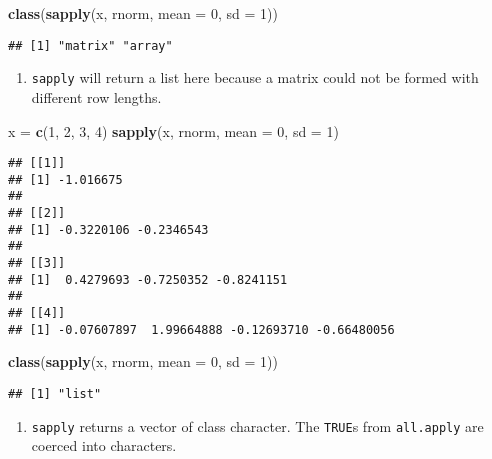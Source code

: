 \documentclass[
]{article}
\newenvironment{Shaded}{\begin{snugshade}}{\end{snugshade}}
\newcommand{\DataTypeTok}[1]{\textcolor[rgb]{0.13,0.29,0.53}{#1}}
\newcommand{\DecValTok}[1]{\textcolor[rgb]{0.00,0.00,0.81}{#1}}
\newcommand{\KeywordTok}[1]{\textcolor[rgb]{0.13,0.29,0.53}{\textbf{#1}}}
\newcommand{\NormalTok}[1]{#1}
\newcommand{\StringTok}[1]{\textcolor[rgb]{0.31,0.60,0.02}{#1}}
\providecommand{\tightlist}{%
  \setlength{\itemsep}{0pt}\setlength{\parskip}{0pt}}
\begin{document}
\begin{Shaded}
\begin{Highlighting}[]
\KeywordTok{class}\NormalTok{(}\KeywordTok{sapply}\NormalTok{(x, rnorm, }\DataTypeTok{mean =} \DecValTok{0}\NormalTok{, }\DataTypeTok{sd =} \DecValTok{1}\NormalTok{))}
\end{Highlighting}
\end{Shaded}

\begin{verbatim}
## [1] "matrix" "array"
\end{verbatim}

\begin{enumerate}
\def\labelenumi{\arabic{enumi}.}
\setcounter{enumi}{1}
\tightlist
\item
  \texttt{sapply} will return a list here because a matrix could not be
  formed with different row lengths.
\end{enumerate}

\begin{Shaded}
\begin{Highlighting}[]
\NormalTok{x =}\StringTok{ }\KeywordTok{c}\NormalTok{(}\DecValTok{1}\NormalTok{, }\DecValTok{2}\NormalTok{, }\DecValTok{3}\NormalTok{, }\DecValTok{4}\NormalTok{)}
\KeywordTok{sapply}\NormalTok{(x, rnorm, }\DataTypeTok{mean =} \DecValTok{0}\NormalTok{, }\DataTypeTok{sd =} \DecValTok{1}\NormalTok{)}
\end{Highlighting}
\end{Shaded}

\begin{verbatim}
## [[1]]
## [1] -1.016675
## 
## [[2]]
## [1] -0.3220106 -0.2346543
## 
## [[3]]
## [1]  0.4279693 -0.7250352 -0.8241151
## 
## [[4]]
## [1] -0.07607897  1.99664888 -0.12693710 -0.66480056
\end{verbatim}

\begin{Shaded}
\begin{Highlighting}[]
\KeywordTok{class}\NormalTok{(}\KeywordTok{sapply}\NormalTok{(x, rnorm, }\DataTypeTok{mean =} \DecValTok{0}\NormalTok{, }\DataTypeTok{sd =} \DecValTok{1}\NormalTok{))}
\end{Highlighting}
\end{Shaded}

\begin{verbatim}
## [1] "list"
\end{verbatim}

\begin{enumerate}
\def\labelenumi{\arabic{enumi}.}
\setcounter{enumi}{2}
\tightlist
\item
  \texttt{sapply} returns a vector of class character. The
  \texttt{TRUE}s from \texttt{all.apply} are coerced into characters.
\end{enumerate}
\end{document}
